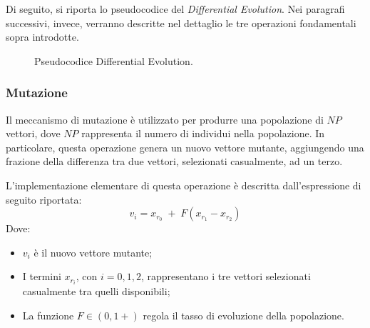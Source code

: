 Di seguito, si riporta lo pseudocodice del \textit{Differential Evolution}.
Nei paragrafi successivi, invece, verranno descritte nel dettaglio le tre operazioni fondamentali sopra introdotte.

\begin{figure}[H]
    \centering
    \begin{minipage}{\linewidth}
    \begin{algorithm}[H]
    \SetAlgoLined
    \end{algorithm}
    \end{minipage}
    \caption{Pseudocodice Differential Evolution.}
\end{figure}

\subsubsection{Mutazione}

Il meccanismo di mutazione è utilizzato per produrre una popolazione di $NP$ vettori, dove $NP$ rappresenta il numero di individui nella popolazione.
In particolare, questa operazione genera un nuovo vettore mutante, aggiungendo una frazione della differenza tra due vettori, selezionati casualmente, ad un terzo.

L'implementazione elementare di questa operazione è descritta dall'espressione di seguito riportata:
\begin{equation*}
    v_{i} = x_{r_{0}} \; + \; F(x_{r_{1}} - x_{r_{2}})
\end{equation*}
Dove:
\begin{itemize}
    \item $v_{i}$ è il nuovo vettore mutante;
    \item I termini $x_{r_i}$, con $i = 0,1,2$, rappresentano i tre vettori selezionati casualmente tra quelli disponibili;
    \item La funzione $F \in (0,1+)$ regola il tasso di evoluzione della popolazione.
\end{itemize}

